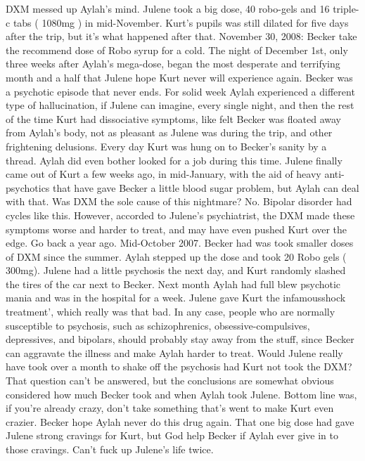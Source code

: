 \documentclass[12pt]{book}
\begin{document}
DXM messed up Aylah's mind. Julene took a big dose, 40 robo-gels and 16 triple-c tabs ( 1080mg ) in mid-November. Kurt's pupils was still dilated for five days after the trip, but it's what happened after that. November 30, 2008: Becker take the recommend dose of Robo syrup for a cold. The night of December 1st, only three weeks after Aylah's mega-dose, began the most desperate and terrifying month and a half that Julene hope Kurt never will experience again. Becker was a psychotic episode that never ends. For solid week Aylah experienced a different type of hallucination, if Julene can imagine, every single night, and then the rest of the time Kurt had dissociative symptoms, like felt Becker was floated away from Aylah's body, not as pleasant as Julene was during the trip, and other frightening delusions. Every day Kurt was hung on to Becker's sanity by a thread. Aylah did even bother looked for a job during this time. Julene finally came out of Kurt a few weeks ago, in mid-January, with the aid of heavy anti-psychotics that have gave Becker a little blood sugar problem, but Aylah can deal with that. Was DXM the sole cause of this nightmare? No. Bipolar disorder had cycles like this. However, accorded to Julene's psychiatrist, the DXM made these symptoms worse and harder to treat, and may have even pushed Kurt over the edge. Go back a year ago. Mid-October 2007. Becker had was took smaller doses of DXM since the summer. Aylah stepped up the dose and took 20 Robo gels ( 300mg). Julene had a little psychosis the next day, and Kurt randomly slashed the tires of the car next to Becker. Next month Aylah had full blew psychotic mania and was in the hospital for a week. Julene gave Kurt the infamousshock treatment', which really was that bad. In any case, people who are normally susceptible to psychosis, such as schizophrenics, obsessive-compulsives, depressives, and bipolars, should probably stay away from the stuff, since Becker can aggravate the illness and make Aylah harder to treat. Would Julene really have took over a month to shake off the psychosis had Kurt not took the DXM? That question can't be answered, but the conclusions are somewhat obvious considered how much Becker took and when Aylah took Julene. Bottom line was, if you're already crazy, don't take something that's went to make Kurt even crazier. Becker hope Aylah never do this drug again. That one big dose had gave Julene strong cravings for Kurt, but God help Becker if Aylah ever give in to those cravings. Can't fuck up Julene's life twice.
\end{document}
